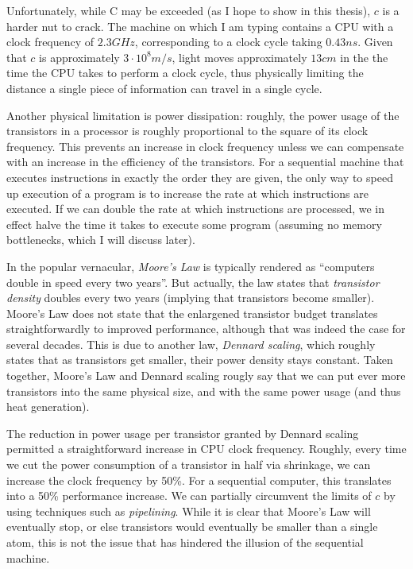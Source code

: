 Unfortunately, while C may be exceeded (as I hope to show in this
thesis), $c$ is a harder nut to crack.  The machine on which I am
typing contains a CPU with a clock frequency of $2.3GHz$,
corresponding to a clock cycle taking $0.43ns$.  Given that $c$ is
approximately $3\cdot10^{8}m/s$, light moves approximately $13cm$ in
the the time the CPU takes to perform a clock cycle, thus physically
limiting the distance a single piece of information can travel in a
single cycle.

Another physical limitation is power dissipation: roughly, the power
usage of the transistors in a processor is roughly proportional to the
square of its clock frequency.  This prevents an increase in clock
frequency unless we can compensate with an increase in the efficiency
of the transistors.  For a sequential machine that executes
instructions in exactly the order they are given, the only way to
speed up execution of a program is to increase the rate at which
instructions are executed.  If we can double the rate at which
instructions are processed, we in effect halve the time it takes to
execute some program (assuming no memory bottlenecks, which I will
discuss later).

In the popular vernacular, \textit{Moore's Law} is typically rendered
as ``computers double in speed every two years''.  But actually, the
law states that \textit{transistor density} doubles every two years
(implying that transistors become smaller).  Moore's Law does not
state that the enlargened transistor budget translates
straightforwardly to improved performance, although that was indeed
the case for several decades.  This is due to another law,
\textit{Dennard scaling}, which roughly states that as transistors get
smaller, their power density stays constant.  Taken together, Moore's
Law and Dennard scaling rougly say that we can put ever more
transistors into the same physical size, and with the same power usage
(and thus heat generation).

The reduction in power usage per transistor granted by Dennard scaling
permitted a straightforward increase in CPU clock frequency.  Roughly,
every time we cut the power consumption of a transistor in half via
shrinkage, we can increase the clock frequency by 50\%.  For a
sequential computer, this translates into a 50\% performance increase.
We can partially circumvent the limits of $c$ by using techniques such
as \textit{pipelining}.  While it is clear that Moore's Law will
eventually stop, or else transistors would eventually be smaller than
a single atom, this is not the issue that has hindered the illusion of the
sequential machine.

